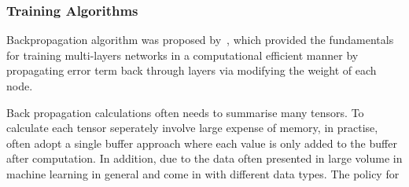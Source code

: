 \subsubsection{Training Algorithms}
Backpropagation algorithm was proposed by~\citet{werbos1975beyond}, which provided the fundamentals for training multi-layers networks in a computational efficient manner by propagating error term back through layers via modifying the weight of each node. 
\par
Back propagation calculations often needs to summarise many tensors. To calculate each tensor seperately involve large expense of memory, in practise, often adopt a single buffer approach where each value is only added to the buffer after computation. In addition, due to the data often presented in large volume in machine learning in general and come in with different data types. The policy for  